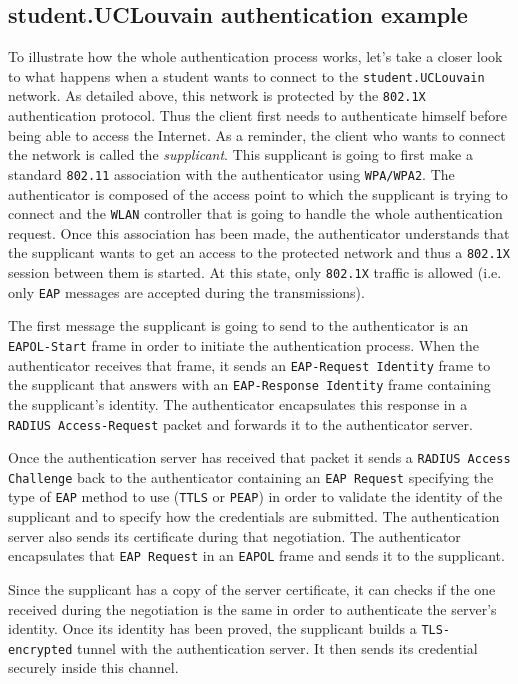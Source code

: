 \subsection{student.UCLouvain authentication example}
To illustrate how the whole authentication process works, let's take a closer look to what happens when a student wants to connect to the \texttt{student.UCLouvain} network.
As detailed above, this network is protected by the \texttt{802.1X} authentication protocol. Thus the client first needs to authenticate himself before being able to access the Internet.
As a reminder, the client who wants to connect the network is called the \textit{supplicant}. This supplicant is going to first make a standard \texttt{802.11} association with the authenticator using \texttt{WPA/WPA2}. The authenticator is composed of the access point to which the supplicant is trying to connect and the \texttt{WLAN} controller that is going to handle the whole authentication request. Once this association has been made, the authenticator understands that the supplicant wants to get an access to the protected network and thus a \texttt{802.1X} session between them is started. At this state, only \texttt{802.1X} traffic is allowed (i.e. only \texttt{EAP} messages are accepted during the transmissions).

The first message the supplicant is going to send to the authenticator is an \texttt{EAPOL-Start} frame in order to initiate the authentication process. When the authenticator receives that frame, it sends an \texttt{EAP-Request Identity} frame to the supplicant that answers with an \texttt{EAP-Response Identity} frame containing the supplicant's identity. The authenticator encapsulates this response in a \texttt{RADIUS Access-Request} packet and forwards it to the authenticator server.

Once the authentication server has received that packet it sends a \texttt{RADIUS Access Challenge} back to the authenticator containing an \texttt{EAP Request} specifying the type of \texttt{EAP} method to use (\texttt{TTLS} or \texttt{PEAP}) in order to validate the identity of the supplicant and to specify how the credentials are submitted. The authentication server also sends its certificate during that negotiation. The authenticator encapsulates that \texttt{EAP Request} in an \texttt{EAPOL} frame and sends it to the supplicant.

Since the supplicant has a copy of the server certificate, it can checks if the one received during the negotiation is the same in order to authenticate the server's identity. Once its identity has been proved, the supplicant builds a \texttt{TLS-encrypted} tunnel with the authentication server. It then sends its credential securely inside this channel.

